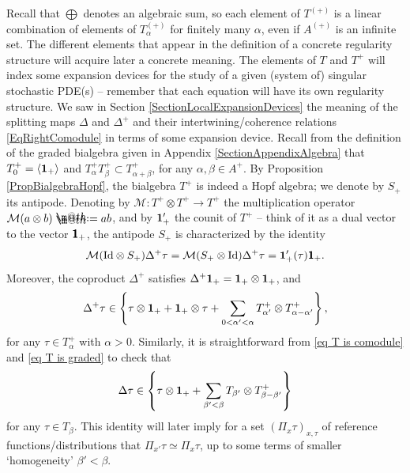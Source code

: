 \documentclass[10pt, reqno]{amsart}
\makeatletter
\numberwithin{subsection}{section}
\numberwithin{subsubsection}{subsection}
\numberwithin{equation}{section} %
\theoremstyle{mystyle}
\theoremstyle{mystyle2}
\theoremstyle{mystyle3}
\newcommand{\mcM}{\mathcal{M}}
\newcommand*{\defeq}{\mathrel{\rlap{%
                     \raisebox{0.3ex}{$\m@th\cdot$}}%
                     \raisebox{-0.3ex}{$\m@th\cdot$}}%
                     =}
\makeatother
\begin{document}
Recall that $\bigoplus$ denotes an algebraic sum, so each element of $T^{(+)}$ is a linear combination of elements of $T_\alpha^{(+)}$ for finitely many $\alpha$, even if $A^{(+)}$ is an infinite set. The different elements that appear in the definition of a concrete regularity structure will acquire later a concrete meaning. The elements of $T$ and $T^+$ will index some expansion devices for the study of a given (system of) singular stochastic PDE(s) -- remember that each equation will have its own regularity structure. We saw in Section \ref{SectionLocalExpansionDevices} the meaning of the splitting maps $\Delta$ and $\Delta^+$ and their intertwining/coherence relations \eqref{EqRightComodule} in terms of some expansion device. Recall from the definition of the graded bialgebra given in Appendix {\sf \ref{SectionAppendixAlgebra}} that $T_0^+=\langle{\bf1}_+\rangle$ and $T_\alpha^+T_\beta^+\subset T_{\alpha+\beta}^+$, for any $\alpha,\beta\in A^+$. By Proposition \ref{PropBialgebraHopf}, the bialgebra $T^+$ is indeed a Hopf algebra; we denote by $S_+$ its antipode. Denoting by $\mcM : T^+\otimes T^+\rightarrow T^+$ the multiplication operator $\mcM(a\otimes b)\defeq ab$, and by ${\bf1}_+'$ the counit of $T^+$ -- think of it as a dual vector to the vector $\textbf{\textsf{1}}_+$, the antipode $S_+$ is characterized by the identity
$$
\mcM(\textrm{Id}\otimes S_+)\Delta^+\tau = \mcM(S_+\otimes\textrm{Id})\Delta^+\tau = {\bf1}_+'(\tau)\textbf{\textsf{1}}_+.
$$
Moreover, the coproduct $\Delta^+$ satisfies $\Delta^+{\bf1}_+={\bf1}_+\otimes{\bf1}_+$, and 
   \begin{equation}   \label{EqDefnDeltaPlus}
   \Delta^+\tau \in \left\{\tau\otimes {\bf 1}_+ + {\bf 1}_+\otimes \tau + \sum_{0<\alpha'<\alpha} T^+_{\alpha'}\otimes T^+_{\alpha-\alpha'}\right\},
   \end{equation}
for any $\tau\in T_\alpha^+$ with $\alpha>0$. Similarly, it is straightforward from \eqref{eq T is comodule} and \eqref{eq T is graded} to check that
\begin{equation}\label{EqDelta}  
\Delta \tau \in \left\{\tau\otimes {\bf 1}_+ + \sum_{\beta'<\beta} T_{\beta'}\otimes T^+_{\beta-\beta'}\right\}
\end{equation}
for any $\tau\in T_\beta$. This identity will later imply for a set $(\Pi_x\tau)_{x,\tau}$ of reference functions/distributions that $\Pi_{x'}\tau\simeq\Pi_x\tau$, up to some terms of smaller `homogeneity' $\beta'<\beta$.
\end{document}
